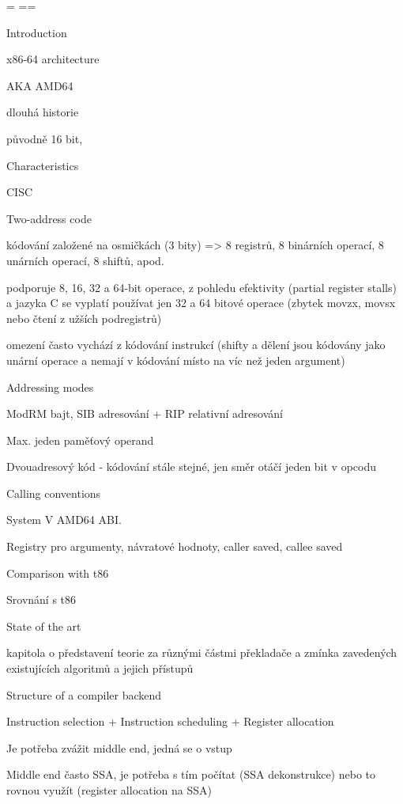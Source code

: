 {\nopagenumbers
  {\pgbackground={
    \picwidth=\pagewidth \picheight=\pageheight
    }
    \null\vfil\break}
  \null\vfil\break}
\makefront

\chap Introduction



\chap x86-64 architecture

AKA AMD64

dlouhá historie

původně 16 bit,


\sec Characteristics

CISC

Two-address code

kódování založené na osmičkách (3 bity) => 8 registrů, 8 binárních operací, 8
unárních operací, 8 shiftů, apod.

podporuje 8, 16, 32 a 64-bit operace, z pohledu efektivity (partial register
stalls) a jazyka C se vyplatí používat jen 32 a 64 bitové operace (zbytek movzx,
movsx nebo čtení z užších podregistrů)

omezení často vychází z kódování instrukcí (shifty a dělení jsou kódovány jako unární operace
a nemají v kódování místo na víc než jeden argument)

\secc Addressing modes

ModRM bajt, SIB adresování + RIP relativní adresování

Max. jeden paměťový operand

Dvouadresový kód - kódování stále stejné, jen směr otáčí jeden bit v opcodu

\sec Calling conventions

System V AMD64 ABI. 

Registry pro argumenty, návratové hodnoty, caller saved, callee saved

\sec Comparison with t86

Srovnání s t86

\chap State of the art

kapitola o představení teorie za různými částmi překladače a zmínka zavedených
existujících algoritmů a jejich přístupů

\sec Structure of a compiler backend

Instruction selection + Instruction scheduling + Register allocation

Je potřeba zvážit middle end, jedná se o vstup

Middle end často SSA, je potřeba s tím počítat (SSA dekonstrukce) nebo to rovnou
využít (register allocation na SSA)

